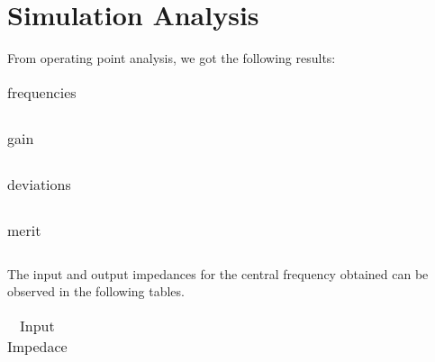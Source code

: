 \section{Simulation Analysis}
\label{sec:simulation} 

From operating point analysis, we got the following results:


\FloatBarrier
\begin{table}[h]
  \centering
  \begin{tabular}{|c|c|c|c|c|}
    \hline    
    
    \hline
  \end{tabular}
  \caption{frequencies}
  \label{tab:Spice1}
\end{table}
\FloatBarrier 

\FloatBarrier
\begin{table}[h]
  \centering
  \begin{tabular}{|c|c|c|c|c|}
    \hline    
    
    \hline
  \end{tabular}
  \caption{gain}
  \label{tab:Spice1}
\end{table}
\FloatBarrier 

\FloatBarrier
\begin{table}[h]
  \centering
  \begin{tabular}{|c|c|c|c|c|}
    \hline    
    
    \hline
  \end{tabular}
  \caption{deviations}
  \label{tab:Spice1}
\end{table}
\FloatBarrier 

\FloatBarrier
\begin{table}[h]
  \centering
  \begin{tabular}{|c|c|c|c|c|}
    \hline    
    
    \hline
  \end{tabular}
  \caption{merit}
  \label{tab:Spice1}
\end{table}
\FloatBarrier  

The input and output impedances for the central frequency obtained can be observed in the following tables.

\FloatBarrier
\begin{table}[h]
  \centering
  \begin{tabular}{|c|c|}
    \hline    
    
    \hline
  \end{tabular}
  \caption{Input Impedace}
  \label{tab:Spice1}
\end{table}
\FloatBarrier 
  
